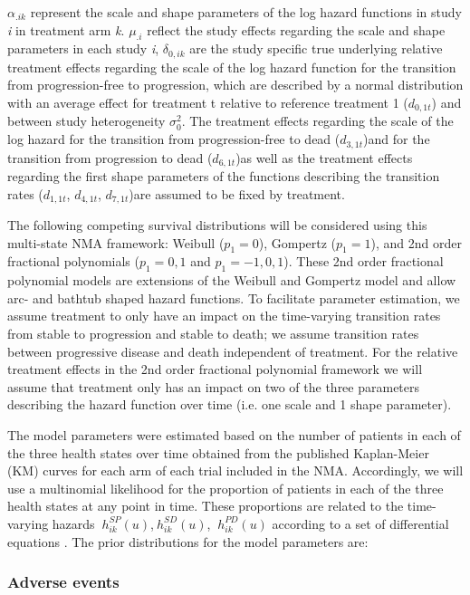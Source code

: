 \documentclass[11pt,final,fleqn]{article}\usepackage[]{graphicx}\usepackage[]{color}
\theoremstyle{plain}
\begin{document}
{\begin{appendices}
$\alpha_{.ik} $ represent the scale and shape parameters of the log hazard functions in study \textit{i} in treatment arm \textit{k}. $\mu_{.i} $ reflect the study effects regarding the scale and shape parameters in each study \textit{i}, $\delta_{0,ik} $ are the study specific true underlying relative treatment effects regarding the scale of the log hazard function for the transition from progression-free to progression, which are described by a normal distribution with an average effect for treatment t relative to reference treatment 1 (${d_{0,1t}}$) and between study heterogeneity $\sigma_{0}^{2} $. The treatment effects regarding the scale of the log hazard for the transition from progression-free to dead (${d_{3,1t}}$)and for the transition from progression to dead (${d_{6,1t}}$)as well as the treatment effects regarding the first shape parameters of the functions describing the transition rates (${d_{1,1t}}$, $d_{4,1t}$, $d_{7,1t}$)are assumed to be fixed by treatment.

The following competing survival distributions will be considered using this multi-state NMA framework: Weibull ($p_{1}=0$), Gompertz ($p_{1}=1$), and 2nd order fractional polynomials ($p_{1}={0,1}$ and $p_{1}={-1,0,1}$). These 2nd order fractional polynomial models are extensions of the Weibull and Gompertz model and allow arc- and bathtub shaped hazard functions. To facilitate parameter estimation, we assume treatment to only have an impact on the time-varying transition rates from stable to progression and stable to death; we assume transition rates between progressive disease and death independent of treatment. For the relative treatment effects in the 2nd order fractional polynomial framework we will assume that treatment only has an impact on two of the three parameters describing the hazard function over time (i.e. one scale and 1 shape parameter).

The model parameters were estimated based on the number of patients in each of the three health states over time obtained from the published Kaplan-Meier (KM) curves for each arm of each trial included in the NMA. Accordingly, we will use a multinomial likelihood for the proportion of patients in each of the three health states at any point in time. These proportions are related to the time-varying hazards $\ h_{ik}^{SP} (u) $,$\ h_{ik}^{SD} (u) $, $\ h_{ik}^{PD} (u)$ according to a set of differential equations \citep{jansen2013network}. The prior distributions for the model parameters are:

\subsubsection{Adverse events}


\end{appendices}}
\end{document}
